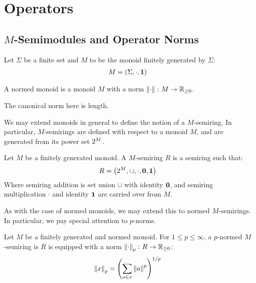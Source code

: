 \documentclass[12pt]{article}
\begin{document}
\section{Operators}


\subsection{\(M\)-Semimodules and Operator Norms}
Let \(\Sigma\) be a finite set and
\(M\) to be the monoid finitely generated by \(\Sigma\):
\begin{align*}
  M = \left(\Sigma, \cdot, \mathbf{1}\right)
\end{align*}

\begin{definition}
  A normed monoid is a monoid \(M\) with a norm
  \(\left\lVert\cdot\right\rVert \colon M \to \mathbb{R}_{\geq 0}\).
\end{definition}

The canonical norm here is length.

We may extend monoids in general to define the notion of a \(M\)-semiring.
In particular,
\(M\)-semirings are defined with respect to a monoid \(M\),
and are generated from its power set \(2^{M}\).

\begin{definition}[\(M\)-Semiring]
  Let \(M\) be a finitely generated monoid.
  A \(M\)-semiring \(R\) is a semiring such that:
  \begin{align*}
    R = \left(2^{M}, \cup, \cdot, \mathbf{0}, \mathbf{1}\right)
  \end{align*}
  Where semiring addition is set union \(\cup\) with identity \(\mathbf{0}\),
  and semiring multiplication \(\cdot\) and identity \(\mathbf{1}\)
  are carried over from \(M\).
\end{definition}

As with the case of normed monoids,
we may extend this to normed \(M\)-semirings.
In particular, we pay special attention to \(p\)-norms.

\begin{definition}
  Let \(M\) be a finitely generated and normed monoid.
  For \(1 \leq p \leq \infty\),
  a \(p\)-normed \(M\)-semiring is \(R\)
  is equipped with a norm \(\left\lVert\cdot\right\rVert_p \colon R \to \mathbb{R}_{\geq 0}\):
  \begin{align*}
    \left\lVert x\right\rVert_{p} = \left(\sum_{a \in x} \left\lVert a\right\rVert ^p\right)^{1/p}
  \end{align*}
\end{definition}
\end{document}
